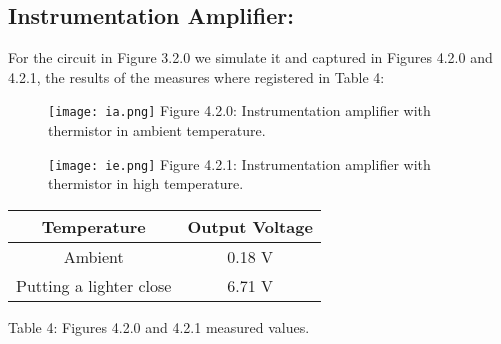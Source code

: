 \subsection{Instrumentation Amplifier:}

For the circuit in Figure 3.2.0 we simulate it and captured in Figures 4.2.0 and 4.2.1, the results of the measures where registered in Table 4:

\begin{figure}[H]
\texttt{[image: ia.png]}
\centering \linebreak \linebreak Figure 4.2.0: Instrumentation amplifier with thermistor in ambient temperature.
\end{figure} \hfill

\begin{figure}[H]
\texttt{[image: ie.png]}
\centering \linebreak \linebreak Figure 4.2.1: Instrumentation amplifier with thermistor in high temperature.
\end{figure} \hfill

\begin{center}
\begin{tabular}{c c}
\toprule \toprule
\hspace{80px} Temperature \hspace{80px} & \hspace{80px} Output Voltage \hspace{80px} \\
\midrule \midrule
Ambient & 0.18 V \\
\cmidrule{1-2}
Putting a lighter close & 6.71 V \\
\bottomrule
\end{tabular}
\linebreak \linebreak Table 4: Figures 4.2.0 and 4.2.1 measured values.
\end{center}

\pagebreak